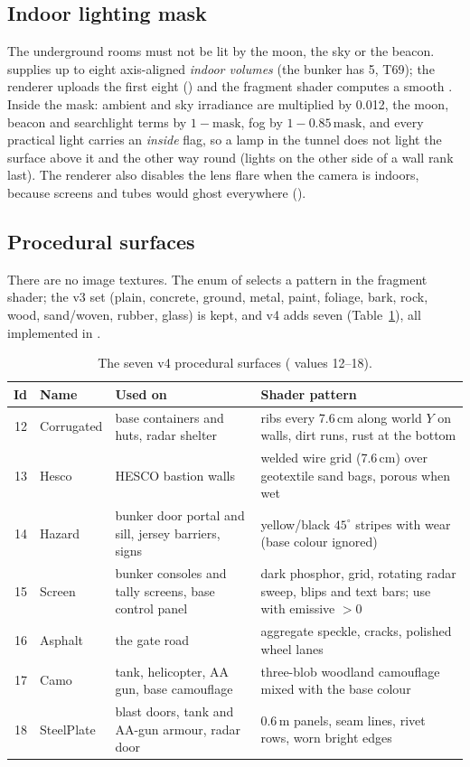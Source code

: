\subsection{Indoor lighting mask}
The underground rooms must not be lit by the moon, the sky or the beacon.  supplies up to eight
axis-aligned \emph{indoor volumes} (the bunker has 5, T69); the renderer uploads the first eight
() and the fragment shader computes a smooth . Inside the mask:
ambient and sky irradiance are multiplied by 0.012, the moon, beacon and searchlight terms by $1-\text{mask}$, fog by
$1-0.85\,\text{mask}$, and every practical light carries an \emph{inside} flag, so a lamp in the tunnel does not
light the surface above it and the other way round (lights on the other side of a wall rank last). The renderer also
disables the lens flare when the camera is indoors, because screens and tubes would ghost everywhere
().

\subsection{Procedural surfaces}
There are no image textures. The  enum of  selects a pattern in the fragment shader;
the v3 set (plain, concrete, ground, metal, paint, foliage, bark, rock, wood, sand/woven, rubber, glass) is kept, and
v4 adds seven (Table~\ref{tab:surfaces}), all implemented in .

\begin{table}[h]
\centering\small
\caption{The seven v4 procedural surfaces ( values 12--18).}
\label{tab:surfaces}
\begin{tabular}{@{}rllp{9cm}@{}}
\toprule
Id & Name & Used on & Shader pattern\\\midrule
12 & Corrugated & base containers and huts, radar shelter & ribs every 7.6\,cm along world $Y$ on walls, dirt runs, rust at the bottom\\
13 & Hesco & HESCO bastion walls & welded wire grid (7.6\,cm) over geotextile sand bags, porous when wet\\
14 & Hazard & bunker door portal and sill, jersey barriers, signs & yellow/black $45^\circ$ stripes with wear (base colour ignored)\\
15 & Screen & bunker consoles and tally screens, base control panel & dark phosphor, grid, rotating radar sweep, blips and text bars; use with emissive $>0$\\
16 & Asphalt & the gate road & aggregate speckle, cracks, polished wheel lanes\\
17 & Camo & tank, helicopter, AA gun, base camouflage & three-blob woodland camouflage mixed with the base colour\\
18 & SteelPlate & blast doors, tank and AA-gun armour, radar door & 0.6\,m panels, seam lines, rivet rows, worn bright edges\\\bottomrule
\end{tabular}
\end{table}

